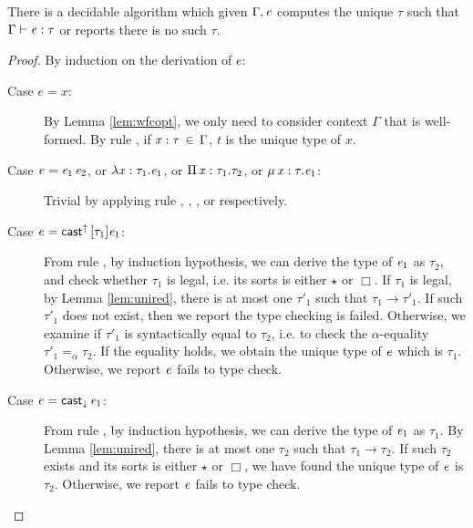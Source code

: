 \begin{lem}
	There is a decidable algorithm which given $\Gamma, \mathit{e}$ computes the unique $\tau$ such that $\Gamma  \vdash  \mathit{e}  :  \tau$ or reports there is no such $\tau$.
\end{lem}

\begin{proof}
	By induction on the derivation of $e$:
	\begin{description}
		\item[Case $e=x$:] By Lemma \ref{lem:wfcopt}, we only need to consider context $\Gamma$ that is well-formed. By rule , if $\mathit{x}  :  \tau \, \in \, \Gamma$, $t$ is the unique type of $x$.
		\item[Case $e=\mathit{e_{{\mathrm{1}}}} \, \mathit{e_{{\mathrm{2}}}}$, or $\lambda  \mathit{x}  :  \tau_{{\mathrm{1}}}  .  \mathit{e_{{\mathrm{1}}}}$, or $\Pi \, \mathit{x}  :  \tau_{{\mathrm{1}}}  .  \tau_{{\mathrm{2}}}$, or $\mu \, \mathit{x}  :  \tau  .  \mathit{e_{{\mathrm{1}}}}$:] Trivial by applying rule , , , or  respectively.
		\item[Case $e=\mathsf{cast}^{\uparrow} \, [  \tau_{{\mathrm{1}}}  ]  \mathit{e_{{\mathrm{1}}}}$:] From rule , by induction hypothesis, we can derive the type of $\mathit{e_{{\mathrm{1}}}}$ as $\tau_{{\mathrm{2}}}$, and check whether $\tau_{{\mathrm{1}}}$ is legal, i.e. its sorts is either $ \star $ or $ \Box $. If $\tau_{{\mathrm{1}}}$ is legal, by Lemma \ref{lem:unired}, there is at most one $\tau'_{{\mathrm{1}}}$ such that $\tau_{{\mathrm{1}}}  \longrightarrow  \tau'_{{\mathrm{1}}}$. If such $\tau'_{{\mathrm{1}}}$ does not exist, then we report the type checking is failed. Otherwise, we examine if $\tau'_{{\mathrm{1}}}$ is syntactically equal to $\tau_{{\mathrm{2}}}$, i.e. to check the $\alpha$-equality $ \tau'_{{\mathrm{1}}}  =_{\alpha}  \tau_{{\mathrm{2}}} $. If the equality holds, we obtain the unique type of $\mathit{e}$ which is $\tau_{{\mathrm{1}}}$. Otherwise, we report $\mathit{e}$ fails to type check.
		\item[Case $e=\mathsf{cast}_{\downarrow} \, \mathit{e_{{\mathrm{1}}}}$:] From rule , by induction hypothesis, we can derive the type of $\mathit{e_{{\mathrm{1}}}}$ as $\tau_{{\mathrm{1}}}$. By Lemma \ref{lem:unired}, there is at most one $\tau_{{\mathrm{2}}}$ such that $\tau_{{\mathrm{1}}}  \longrightarrow  \tau_{{\mathrm{2}}}$. If such $\tau_{{\mathrm{2}}}$ exists and its sorts is either $ \star $ or $ \Box $, we have found the unique type of $\mathit{e}$ is $\tau_{{\mathrm{2}}}$. Otherwise, we report $\mathit{e}$ fails to type check.
	\end{description}
\end{proof}

